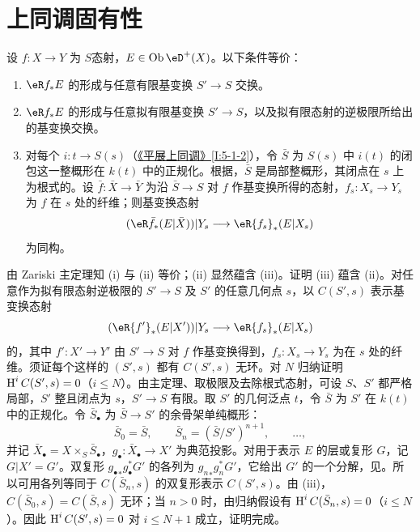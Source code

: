 \section{上同调固有性}\label{VII:5-1}
\begin{proposition_}\label{VII:5-1-1}
设 $f:X\to Y$ 为 $S$态射，$E\in\ob\eD^+(X)$。以下条件等价：
\begin{enumerate}[\indent (i)]
\item $\eR f_\ast E$ 的形成与任意有限基变换 $S'\to S$ 交换。
\item $\eR f_\ast E$ 的形成与任意拟有限基变换 $S'\to S$，以及拟有限态射的逆极限所给出的基变换交换。
\item 对每个 $i:t\to S(s)$（\hyperref[I]{《平展上同调》}\ref{I:5-1-2}），令 $\bar S$ 为 $S(s)$ 中 $i(t)$ 的闭包这一整概形在 $k(t)$ 中的正规化。根据\cite[IV 6.15.5、18.5.11、18.8.16]{ega}，$\bar S$ 是局部整概形，其闭点在 $s$ 上为根式的。设 $\bar f:\bar X\to\bar Y$ 为沿 $\bar S\to S$ 对 $f$ 作基变换所得的态射，$f_s:X_s\to Y_s$ 为 $f$ 在 $s$ 处的纤维；则基变换态射
\[
 (\eR\bar f_\ast(E|\bar X))|Y_s\longrightarrow\eR{f_s}_\ast(E|X_s)
\]
为同构。
\end{enumerate}
\end{proposition_}
由 Zariski 主定理知 (i) 与 (ii) 等价；(ii) 显然蕴含 (iii)。证明 (iii) 蕴含 (ii)。对任意作为拟有限态射逆极限的 $S'\to S$ 及 $S'$ 的任意几何点 $s$，以 $C(S',s)$ 表示基变换态射
\[
 (\eR{f'}_\ast(E|X'))|Y_s\longrightarrow\eR{f_s}_\ast(E|X_s)
\]
的，其中 $f':X'\to Y'$ 由 $S'\to S$ 对 $f$ 作基变换得到，$f_s:X_s\to Y_s$ 为在 $s$ 处的纤维。须证每个这样的 $(S',s)$ 都有 $C(S',s)$ 无环。对 $N$ 归纳证明 $\operatorname{H}^iC(S',s)=0$（$i\leqslant N$）。由主定理、取极限及去除根式态射，可设 $S$、$S'$ 都严格局部，$S'$ 整且闭点为 $s$，$S'\to S$ 有限。取 $S'$ 的几何泛点 $t$，令 $\bar S$ 为 $S'$ 在 $k(t)$ 中的正规化。令 $\bar S_\bullet$ 为 $\bar S\to S'$ 的余骨架单纯概形：
\[
 \bar S_0=\bar S,\qquad \bar S_n=(\bar S/S')^{n+1},\qquad\ldots,
\]
并记 $\bar X_\bullet=X\times_S\bar S_\bullet$，$g_\bullet:\bar X_\bullet\to X'$ 为典范投影。对用于表示 $E$ 的层或复形 $G$，记 $G|X'=G'$。双复形 ${g_\bullet}_\ast g_\bullet^\ast G'$ 的各列为 ${g_n}_\ast g_n^\ast G'$，它给出 $G'$ 的一个分解，见\cite[VIII 8]{sga4}。所以可用各列等同于 $C(\bar S_n,s)$ 的双复形表示 $C(S',s)$。由 (iii)，$C(\bar S_0,s)=C(\bar S,s)$ 无环；当 $n>0$ 时，由归纳假设有 $\operatorname{H}^iC(\bar S_n,s)=0$（$i\leqslant N$）。因此 $\operatorname{H}^iC(S',s)=0$ 对 $i\leqslant N+1$ 成立，证明完成。
